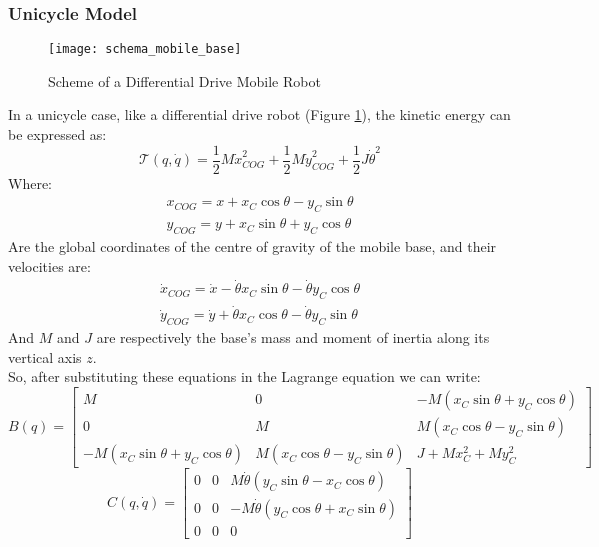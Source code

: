 \subsubsection{Unicycle Model}
\begin{figure}[h!]
	\centering
	\texttt{[image: schema\_mobile\_base]}
	\caption{Scheme of a Differential Drive Mobile Robot}
	\label{diffdrive}
\end{figure}
In a unicycle case, like a differential drive robot (Figure \ref{diffdrive}), the kinetic energy can be expressed as: 
\begin{equation}
\mathcal{T}(q,\dot{q})=\frac{1}{2}M\dot{x}_{COG}^2 + \frac{1}{2}M\dot{y}_{COG}^2 + \frac{1}{2}J\dot{\theta}^2
\end{equation}
Where:
\begin{align*}
x_{COG} = x+x_C\cos\theta-y_C\sin\theta\\ 
y_{COG} = y+x_C\sin\theta+y_C\cos\theta
\end{align*}
Are the global coordinates of the centre of gravity of the mobile base, and their velocities are:
\begin{align*}
\dot{x}_{COG} = \dot{x}-\dot{\theta}x_C\sin\theta-\dot{\theta}y_C\cos\theta\\ 
\dot{y}_{COG} = \dot{y}+\dot{\theta}x_C\cos\theta-\dot{\theta}y_C\sin\theta
\end{align*}
And $M$ and $J$ are respectively the base’s mass and moment of inertia along its vertical axis $z$.\\
So, after substituting these equations in the Lagrange equation we can write:
\begin{equation*}
B(q)=\left[ 
\begin{matrix}
M & 0 & -M\left( x_C\sin\theta + y_C\cos\theta\right) \\
0 & M & M\left( x_C\cos\theta - y_C\sin\theta\right) \\
-M\left( x_C\sin\theta + y_C\cos\theta\right) & M\left( x_C\cos\theta - y_C\sin\theta\right) & J+M x_C^2+M y_C^2
\end{matrix}
\right]
\end{equation*}
\begin{equation}
C(q,\dot{q})=\left[ 
\begin{matrix}
0 & 0 & M\dot{\theta}\left( y_C\sin\theta - x_C\cos\theta\right) \\
0 & 0 & -M\dot{\theta}\left( y_C\cos\theta +x_C\sin\theta\right) \\
0 & 0 & 0
\end{matrix}
\right]
\end{equation}
